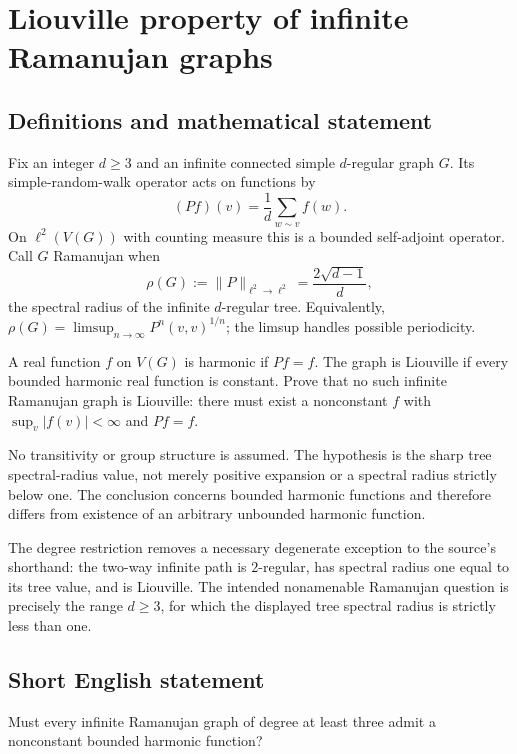 \documentclass[11pt,a4paper]{article}
\begin{document}
\section*{Liouville property of infinite Ramanujan graphs}\label{statement}

\subsection{Definitions and mathematical statement}
Fix an integer $d\ge3$ and an infinite connected simple $d$-regular graph $G$. Its simple-random-walk operator acts on functions by
\[
(Pf)(v)=\frac1d\sum_{w\sim v}f(w).
\]
On $\ell^2(V(G))$ with counting measure this is a bounded self-adjoint operator. Call $G$ Ramanujan when
\[
\rho(G):=\|P\|_{\ell^2\to\ell^2}=\frac{2\sqrt{d-1}}{d},
\]
the spectral radius of the infinite $d$-regular tree. Equivalently, $\rho(G)=\limsup_{n\to\infty}P^n(v,v)^{1/n}$; the limsup handles possible periodicity.

A real function $f$ on $V(G)$ is harmonic if $Pf=f$. The graph is Liouville if every bounded harmonic real function is constant. Prove that no such infinite Ramanujan graph is Liouville: there must exist a nonconstant $f$ with $\sup_v|f(v)|<\infty$ and $Pf=f$.

No transitivity or group structure is assumed. The hypothesis is the sharp tree spectral-radius value, not merely positive expansion or a spectral radius strictly below one. The conclusion concerns bounded harmonic functions and therefore differs from existence of an arbitrary unbounded harmonic function.

The degree restriction removes a necessary degenerate exception to the source's shorthand: the two-way infinite path is $2$-regular, has spectral radius one equal to its tree value, and is Liouville. The intended nonamenable Ramanujan question is precisely the range $d\ge3$, for which the displayed tree spectral radius is strictly less than one.
\subsection{Short English statement}
Must every infinite Ramanujan graph of degree at least three admit a nonconstant bounded harmonic function?
\end{document}
